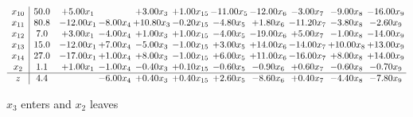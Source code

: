 \documentclass[9pt]{article}
\begin{document}
 \[\begin{array}{c| c c@{\hskip 2pt} c@{\hskip 2pt} c@{\hskip 2pt} c@{\hskip 2pt} c@{\hskip 2pt} c@{\hskip 2pt} c@{\hskip 2pt} c@{\hskip 2pt} c@{\hskip 2pt} }
 x_{10}   &  50.0 & +  5.00 x_{1} &   & +  3.00 x_{3} & +  1.00 x_{15} & -11.00 x_{5} & -12.00 x_{6} & -3.00 x_{7} & -9.00 x_{8} & -16.00 x_{9}\\
 x_{11}   &  80.8 & -12.00 x_{1} & -8.00 x_{4} & + 10.80 x_{3} & -0.20 x_{15} & -4.80 x_{5} & +  1.80 x_{6} & -11.20 x_{7} & -3.80 x_{8} & -2.60 x_{9}\\
 x_{12}   &  7.0 & +  3.00 x_{1} & -4.00 x_{4} & +  1.00 x_{3} & +  1.00 x_{15} & -4.00 x_{5} & -19.00 x_{6} & +  5.00 x_{7} & -1.00 x_{8} & -14.00 x_{9}\\
 x_{13}   &  15.0 & -12.00 x_{1} & +  7.00 x_{4} & -5.00 x_{3} & -1.00 x_{15} & +  3.00 x_{5} & + 14.00 x_{6} & -14.00 x_{7} & + 10.00 x_{8} & + 13.00 x_{9}\\
 x_{14}   &  27.0 & -17.00 x_{1} & +  1.00 x_{4} & +  8.00 x_{3} & -1.00 x_{15} & +  6.00 x_{5} & + 11.00 x_{6} & -16.00 x_{7} & +  8.00 x_{8} & + 14.00 x_{9}\\
 x_{2}   &  1.1 & +  1.00 x_{1} & -1.00 x_{4} & -0.40 x_{3} & +  0.10 x_{15} & -0.60 x_{5} & -0.90 x_{6} & +  0.60 x_{7} & -0.60 x_{8} & -0.70 x_{9}\\
\hline
z    &  4.4  &   & -6.00 x_{4} & +  0.40 x_{3} & +  0.40 x_{15} & +  2.60 x_{5} & -8.60 x_{6} & +  0.40 x_{7} & -4.40 x_{8} & -7.80 x_{9}\\
\end{array}\]


 $ x_{3} $ enters and $ x_{2} $ leaves 
\end{document}
